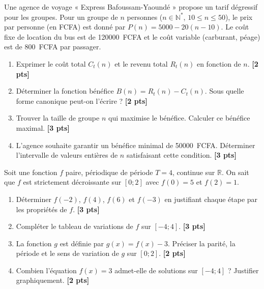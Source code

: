 \documentclass[11pt]{article}
\begin{document}
\begin{exercice}
Une agence de voyage « Express Bafoussam-Yaoundé » propose un tarif dégressif pour les groupes. Pour un groupe de $n$ personnes ($n \in \mathbb{N}^*$, $10 \le n \le 50$), le prix par personne (en FCFA) est donné par $P(n) = 5000 - 20(n-10)$. Le coût fixe de location du bus est de \SI{120000}{FCFA} et le coût variable (carburant, péage) est de \SI{800}{FCFA} par passager.
\begin{enumerate}
    \item Exprimer le coût total $C_t(n)$ et le revenu total $R_t(n)$ en fonction de $n$. \hfill\textbf{[2 pts]}
    \item Déterminer la fonction bénéfice $B(n) = R_t(n) - C_t(n)$. Sous quelle forme canonique peut-on l'écrire ? \hfill\textbf{[2 pts]}
    \item Trouver la taille de groupe $n$ qui maximise le bénéfice. Calculer ce bénéfice maximal. \hfill\textbf{[3 pts]}
    \item L'agence souhaite garantir un bénéfice minimal de \SI{50000}{FCFA}. Déterminer l'intervalle de valeurs entières de $n$ satisfaisant cette condition. \hfill\textbf{[3 pts]}
\end{enumerate}
\end{exercice}

\begin{exercice}
Soit une fonction $f$ paire, périodique de période $T = 4$, continue sur $\mathbb{R}$. On sait que $f$ est strictement décroissante sur $[0; 2]$ avec $f(0) = 5$ et $f(2) = 1$.
\begin{enumerate}
    \item Déterminer $f(-2)$, $f(4)$, $f(6)$ et $f(-3)$ en justifiant chaque étape par les propriétés de $f$. \hfill\textbf{[3 pts]}
    \item Compléter le tableau de variations de $f$ sur $[-4; 4]$. \hfill\textbf{[3 pts]}
    \item La fonction $g$ est définie par $g(x) = f(x) - 3$. Préciser la parité, la période et le sens de variation de $g$ sur $[0; 2]$. \hfill\textbf{[2 pts]}
    \item Combien l'équation $f(x) = 3$ admet-elle de solutions sur $[-4; 4]$ ? Justifier graphiquement. \hfill\textbf{[2 pts]}
\end{enumerate}
\end{exercice}
\end{document}

